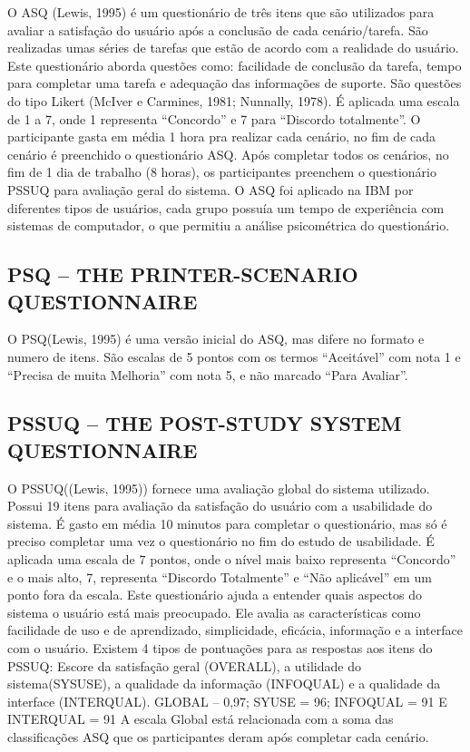 O ASQ (Lewis, 1995) é um questionário de três itens que são utilizados para avaliar a satisfação do usuário após a conclusão de cada cenário/tarefa. São realizadas umas séries de tarefas que estão de acordo com a realidade do usuário.
Este questionário aborda questões como: facilidade de conclusão da tarefa, tempo para completar uma tarefa e adequação das informações de suporte. São questões do tipo Likert (McIver e Carmines, 1981; Nunnally, 1978). É aplicada uma escala de 1 a 7, onde 1 representa “Concordo” e 7 para “Discordo totalmente”. 
O participante gasta em média 1 hora pra realizar cada cenário, no fim de cada cenário é preenchido o questionário ASQ. Após completar todos os cenários, no fim de 1 dia de trabalho (8 horas), os participantes preenchem o questionário PSSUQ para avaliação geral do sistema.
O ASQ foi aplicado na IBM por diferentes tipos de usuários, cada grupo possuía um tempo de experiência com sistemas de computador, o que permitiu a análise psicométrica do questionário.


\subsection{PSQ – THE PRINTER-SCENARIO QUESTIONNAIRE}

O PSQ(Lewis, 1995)  é uma versão inicial do ASQ, mas difere no formato e numero de itens.  São escalas de 5 pontos com os termos “Aceitável” com nota 1 e “Precisa de muita Melhoria” com nota 5, e não marcado “Para Avaliar”.  

\subsection{PSSUQ – THE POST-STUDY SYSTEM QUESTIONNAIRE}

O PSSUQ((Lewis, 1995)) fornece uma avaliação global do sistema utilizado. Possui 19 itens para avaliação da satisfação do usuário com a usabilidade do sistema. É gasto em média 10 minutos para completar o questionário, mas só é preciso completar uma vez o questionário no fim do estudo de usabilidade. 
É aplicada uma escala de 7 pontos, onde o nível mais baixo  representa “Concordo” e o mais alto, 7, representa “Discordo Totalmente” e “Não aplicável” em um ponto fora da escala.
Este questionário ajuda a entender quais aspectos do sistema o usuário está mais preocupado. Ele avalia as características como facilidade de uso e de aprendizado, simplicidade, eficácia, informação e a interface com o usuário.
Existem 4 tipos de pontuações para as respostas aos itens do PSSUQ: Escore da satisfação geral (OVERALL), a utilidade do sistema(SYSUSE), a qualidade da  informação (INFOQUAL) e a qualidade da interface (INTERQUAL). 
GLOBAL – 0,97; SYUSE = 96; INFOQUAL = 91 E INTERQUAL = 91
A escala Global está relacionada com a soma das classificações ASQ que os participantes deram após completar cada cenário. 

